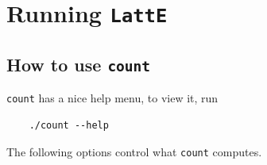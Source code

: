 \documentclass{article}
\begin{document}

\section{Running {\tt LattE}}\label{Running LattE}

\subsection{How to use {\tt count}}

{\tt count} has a nice help menu, to view it, run

\begin{verbatim}
	./count --help
\end{verbatim}


The following options control what {\tt count} computes.
\end{document}
